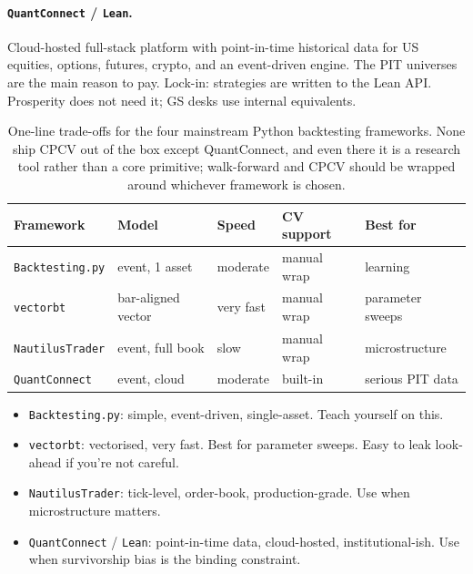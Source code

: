\paragraph{\texttt{QuantConnect} / \texttt{Lean}.} Cloud-hosted
full-stack platform with point-in-time historical data for US
equities, options, futures, crypto, and an event-driven engine.
The PIT universes are the main reason to pay. Lock-in: strategies
are written to the Lean API. Prosperity does not need it; GS desks
use internal equivalents.

\begin{table}[ht]
\centering
\footnotesize
\begin{tabular}{@{}lllll@{}}
\toprule
Framework & Model & Speed & CV support & Best for \\
\midrule
\texttt{Backtesting.py}
  & event, 1 asset
  & moderate
  & manual wrap
  & learning \\
\texttt{vectorbt}
  & bar-aligned vector
  & very fast
  & manual wrap
  & parameter sweeps \\
\texttt{NautilusTrader}
  & event, full book
  & slow
  & manual wrap
  & microstructure \\
\texttt{QuantConnect}
  & event, cloud
  & moderate
  & built-in
  & serious PIT data \\
\bottomrule
\end{tabular}
\caption{One-line trade-offs for the four mainstream Python
backtesting frameworks. None ship CPCV out of the box except
QuantConnect, and even there it is a research tool rather than a
core primitive; walk-forward and CPCV should be wrapped around
whichever framework is chosen.}
\label{tab:bt_framework_comparison}
\end{table}

\begin{keyfactbox}
\begin{itemize}
  \item \texttt{Backtesting.py}: simple, event-driven,
  single-asset. Teach yourself on this.
  \item \texttt{vectorbt}: vectorised, very fast. Best for
  parameter sweeps. Easy to leak look-ahead if you're not
  careful.
  \item \texttt{NautilusTrader}: tick-level, order-book,
  production-grade. Use when microstructure matters.
  \item \texttt{QuantConnect} / \texttt{Lean}: point-in-time
  data, cloud-hosted, institutional-ish. Use when survivorship
  bias is the binding constraint.
\end{itemize}
\end{keyfactbox}

